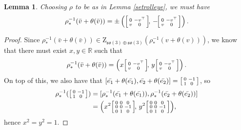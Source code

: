 \documentclass[12pt,a4paper]{amsart}
\newtheorem{lemma}[theorem]{Lemma}
\theoremstyle{definition}
\newenvironment{smallbmatrix}
  {\left[\begin{smallmatrix}}
  {\end{smallmatrix}\right]}
\newcommand{\rotoiso}{\begin{smallbmatrix}0 & -1 \\ 1 & 0\end{smallbmatrix}}
\begin{document}
\begin{lemma}\label{setslideeye} Choosing $\rho$ to be as in Lemma \ref{setrolleye}, we must have
\[\rho_*^{-1}(\bar{v}+\theta(\bar{v}))=\pm\left(\begin{smallbmatrix}0 & -v^\top \\ v & 0\end{smallbmatrix}\!,\,-\!\begin{smallbmatrix}0 & -v^\top \\ v & 0\end{smallbmatrix}\right).\]
\end{lemma}
\begin{proof}Since $\rho_*^{-1}(\bar{v}+\theta(\bar{v}))\in\mathrm{Z}_{\mathfrak{so}(3)\oplus\mathfrak{so}(3)}(\rho_*^{-1}(v+\theta(v)))$, we know that there must exist $x,y\in\mathbb{R}$ such that
\[\rho_*^{-1}(\bar{v}+\theta(\bar{v}))=\left(x\begin{smallbmatrix}0 & -v^\top \\ v & 0\end{smallbmatrix}\!,\,y\begin{smallbmatrix}0 & -v^\top \\ v & 0\end{smallbmatrix}\right).\]
On top of this, we also have that $[\bar{e_1}+\theta(\bar{e_1}),\bar{e_2}+\theta(\bar{e_2})]=\rotoiso$,
so
\begin{align*}\rho_*^{-1}(\rotoiso) & =[\rho_*^{-1}(\bar{e_1}+\theta(\bar{e_1})),\rho_*^{-1}(\bar{e_2}+\theta(\bar{e_2}))] \\ & =\left(x^2\begin{smallbmatrix}0 & 0 & 0 \\ 0 & 0 & -1 \\ 0 & 1 & 0\end{smallbmatrix}\!,\, y^2\begin{smallbmatrix}0 & 0 & 0 \\ 0 & 0 & -1 \\ 0 & 1 & 0\end{smallbmatrix}\right)\!,\end{align*}
hence $x^2=y^2=1$.


\end{proof}
\end{document}
